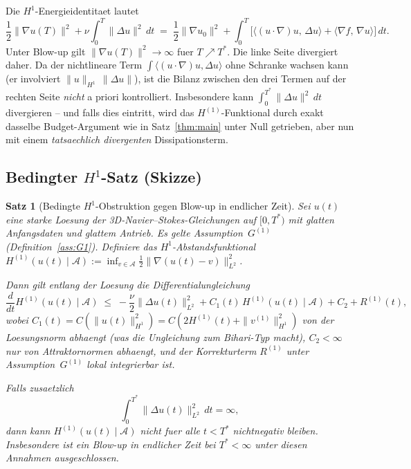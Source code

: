 \documentclass[12pt,a4paper]{article}
\theoremstyle{definition}
\theoremstyle{plain}
\newtheorem{theorem}[definition]{Satz}
\theoremstyle{remark}
\begin{document}
Die $H^1$-Energieidentitaet lautet
\begin{equation}\label{eq:H1-energy-id}
  \frac{1}{2}\|\nabla u(T)\|^2 + \nu\int_0^T\|\Delta u\|^2\,dt
  \;=\;
  \frac{1}{2}\|\nabla u_0\|^2
  + \int_0^T\!\bigl[\langle (u\cdot\nabla)u,\,\Delta u\rangle
  + \langle \nabla f,\, \nabla u\rangle\bigr]\,dt.
\end{equation}
Unter Blow-up gilt $\|\nabla u(T)\|^2 \to \infty$ fuer $T \nearrow T^*$.
Die linke Seite divergiert daher. Da der nichtlineare Term
$\int\langle (u\cdot\nabla)u, \Delta u\rangle$ ohne Schranke wachsen kann
(er involviert $\|u\|_{H^1}\,\|\Delta u\|$), ist die Bilanz
zwischen den drei Termen auf der rechten Seite \emph{nicht} a priori
kontrolliert. Insbesondere kann $\int_0^{T^*}\|\Delta u\|^2\,dt$
divergieren -- und falls dies eintritt, wird das $H^{(1)}$-Funktional durch
exakt dasselbe Budget-Argument wie in Satz~\ref{thm:main} unter Null getrieben,
aber nun mit einem \emph{tatsaechlich divergenten} Dissipationsterm.

\subsection{Bedingter $H^1$-Satz (Skizze)}

\begin{theorem}[Bedingte $H^1$-Obstruktion gegen Blow-up in endlicher Zeit]
\label{thm:H1-main}
Sei $u(t)$ eine starke Loesung der 3D-Navier--Stokes-Gleichungen auf
$[0,T^*)$ mit glatten Anfangsdaten und glattem Antrieb. Es gelte
Assumption~$G^{(1)}$ (Definition~\ref{ass:G1}). Definiere das
$H^1$-Abstandsfunktional
$H^{(1)}(u(t) \mid \mathcal{A})
:= \inf_{v \in \mathcal{A}} \tfrac{1}{2}\|\nabla(u(t)-v)\|_{L^2}^2$.

Dann gilt entlang der Loesung die Differentialungleichung
\begin{equation}\label{eq:H1-diff}
  \frac{d}{dt}H^{(1)}(u(t) \mid \mathcal{A})
  \;\le\;
  -\frac{\nu}{2}\|\Delta u(t)\|_{L^2}^2
  + C_1(t)\,H^{(1)}(u(t) \mid \mathcal{A})
  + C_2
  + R^{(1)}(t),
\end{equation}
wobei $C_1(t) = C(\|u(t)\|_{H^1}^2) = C(2H^{(1)}(t)
+ \|v^{(1)}\|_{H^1}^2)$ von der Loesungsnorm abhaengt (was die
Ungleichung zum Bihari-Typ macht), $C_2 < \infty$ nur von
Attraktornormen abhaengt,
und der Korrekturterm $R^{(1)}$ unter
Assumption~$G^{(1)}$ lokal integrierbar ist.

Falls zusaetzlich
\begin{equation}\label{eq:enstr-diss-div}
  \int_0^{T^*}\|\Delta u(t)\|_{L^2}^2\,dt = \infty,
\end{equation}
dann kann $H^{(1)}(u(t) \mid \mathcal{A})$ nicht fuer alle
$t < T^*$ nichtnegativ bleiben. Insbesondere ist ein Blow-up in endlicher Zeit
bei $T^* < \infty$ unter diesen Annahmen ausgeschlossen.
\end{theorem}
\end{document}

